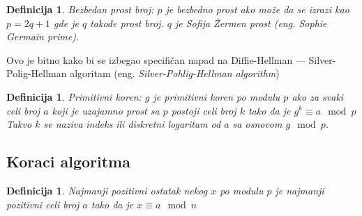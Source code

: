 \documentclass[a4paper]{article}
\newtheorem{defn}[primer]{Definicija}
\begin{document}
\begin{defn}
    \emph{Bezbedan prost broj}: $p$ je bezbedno prost ako može da se izrazi kao $p = 2q + 1$ gde je $q$ takođe prost broj. 
    $q$ je Sofija Žermen prost (eng. \emph{Sophie Germain prime}). 
\end{defn}
Ovo je bitno kako bi se izbegao specifičan napad na Diffie-Hellman --- 
Silver-Polig-Hellman algoritam (eng. \emph{Silver-Pohlig-Hellman algorithm}) \cite{pohlig-hellman}

\begin{defn}
    \emph{Primitivni koren}: $g$ je primitivni koren po modulu $p$ ako za
    svaki celi broj $a$ koji je uzajamno prost sa $p$ postoji celi broj $k$ tako da je
    $g^k \equiv a \mod p$
    Takvo $k$ se naziva indeks ili diskretni logaritam od $a$ sa osnovom $g \mod p$.
\end{defn}


\subsection{Koraci algoritma}
\label{subsec:koraci_algoritma}

\begin{defn}
    Najmanji pozitivni ostatak nekog $x$ po modulu $p$ je najmanji pozitivni celi broj $a$ tako da je 
    $x \equiv a \mod n$
\end{defn}
\end{document}
